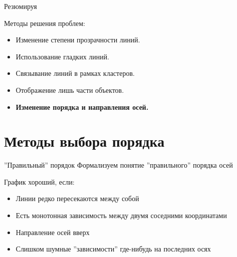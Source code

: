 \documentclass[fleqn, xcolor=x11names]{beamer}
\begin{document}
\begin{frame}{Резюмируя}

    Методы решения проблем:
    \begin{itemize}
        \item Изменение степени прозрачности линий.
        \item Использование гладких линий.
        \item Связывание линий в рамках кластеров.
        \item Отображение лишь части объектов.
        \item \textbf{Изменение порядка и направления осей.}
    \end{itemize}
\end{frame}

\section{Методы выбора порядка}


\begin{frame}{''Правильный'' порядок}
    Формализуем понятие ''правильного'' порядка осей

    \vspace{10pt}

    График хороший, если:
    \begin{itemize}
        \item Линии редко пересекаются между собой
        \item Есть монотонная зависимость между двумя соседними координатами
        \item Направление осей вверх
        \item Слишком шумные ''зависимости'' где-нибудь на последних осях
    \end{itemize}
\end{frame}
\end{document}
